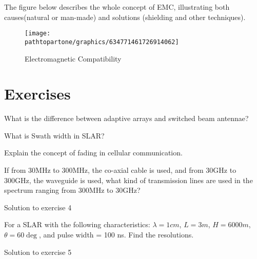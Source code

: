 The figure below describes the whole concept of EMC, illustrating both causes(natural or man-made) and solutions (shielding and other techniques).

\begin{figure}[h]
\centering
\texttt{[image: \\pathtopartone/graphics/634771461726914062]}
\caption{Electromagnetic Compatibility}
\label{fig:634771461726914062}
\end{figure}

\newpage
\section*{Exercises}
\begin{ExerciseList}
\Exercise[label={ex11}]
What is the difference between adaptive arrays and switched beam antennae?

\Exercise[label={ex12}]
What is Swath width in SLAR?

\Exercise[label={ex13}]
Explain the concept of fading in cellular communication.

\Exercise[label={ex14}]
If from 30MHz to 300MHz, the co-axial cable is used, and from 30GHz to 300GHz, the waveguide is used, what kind of transmission lines are used in the spectrum ranging from 300MHz to 30GHz?

\Answer[ref={ex14}]
Solution to exercise 4

\Exercise[label={ex15}]
For a SLAR with the following characteristics: $\lambda = 1cm$, $L = 3m$, $H = 6000m$,
$\theta = 60\deg$, and pulse width = 100 ns. 
Find the resolutions.

\Answer[ref={ex15}]
Solution to exercise 5
\end{ExerciseList}


